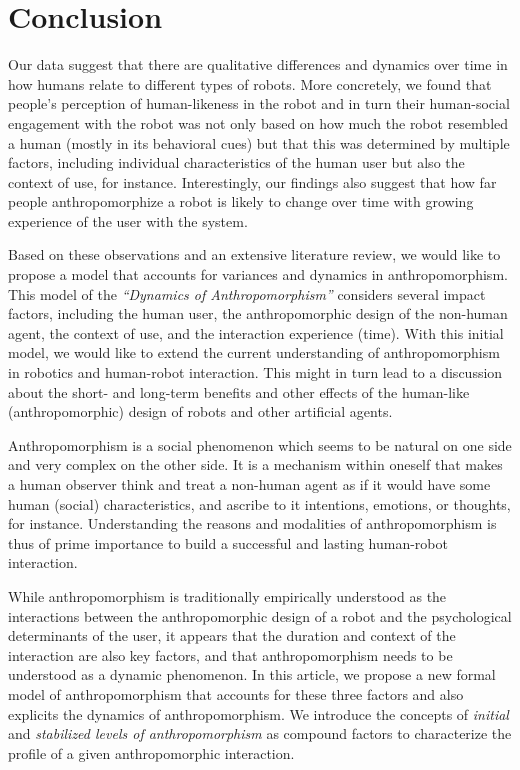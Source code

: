 \documentclass{frontiersSCNS} %
\begin{document}
%
%
%
%
%
%


\section{Conclusion}
\label{sec:conclusion}

Our data suggest that there are qualitative differences and dynamics over time
in how humans relate to different types of robots. More concretely, we found
that people's perception of human-likeness in the robot and in turn their
human-social engagement with the robot was not only based on how much the robot
resembled a human (mostly in its behavioral cues) but that this was determined
by multiple factors, including individual characteristics of the human user but
also the context of use, for instance. Interestingly, our findings also suggest
that how far people anthropomorphize a robot is likely to change over time with
growing experience of the user with the system. 

Based on these observations and an extensive literature review, we would like to
propose a model that accounts for variances and dynamics in anthropomorphism.
This model of the \textit{``Dynamics of Anthropomorphism''} considers several
impact factors, including the human user, the anthropomorphic design of the
non-human agent, the context of use, and the interaction experience (time). With
this initial model, we would like to extend the current understanding of
anthropomorphism in robotics and human-robot interaction. This might in turn
lead to a discussion about the short- and long-term benefits and other effects
of the human-like (anthropomorphic) design of robots and other artificial
agents.


Anthropomorphism is a social phenomenon which seems to be natural on one side
and very complex on the other side. It is a mechanism within oneself that makes
a human observer think and treat a non-human agent as if it would have some
human (social) characteristics, and ascribe to it intentions, emotions, or
thoughts, for instance. Understanding the reasons and modalities of
anthropomorphism is thus of prime importance to build a successful and lasting
human-robot interaction.

While anthropomorphism is traditionally empirically understood as the
interactions between the anthropomorphic design of a robot and the psychological
determinants of the user, it appears that the duration and context of the
interaction are also key factors, and that anthropomorphism needs to be
understood as a dynamic phenomenon. In this article, we propose a new formal
model of anthropomorphism that accounts for these three factors and also
explicits the dynamics of anthropomorphism. We introduce the concepts of
\emph{initial} and \emph{stabilized levels of anthropomorphism} as compound
factors to characterize the profile of a given anthropomorphic interaction.
\end{document}
